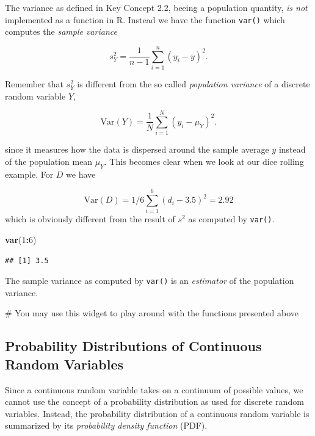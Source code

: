 \documentclass[]{book}
\newenvironment{Shaded}{\begin{snugshade}}{\end{snugshade}}
\newcommand{\KeywordTok}[1]{\textcolor[rgb]{0.13,0.29,0.53}{\textbf{#1}}}
\newcommand{\DecValTok}[1]{\textcolor[rgb]{0.00,0.00,0.81}{#1}}
\newcommand{\OperatorTok}[1]{\textcolor[rgb]{0.81,0.36,0.00}{\textbf{#1}}}
\newcommand{\NormalTok}[1]{#1}
\theoremstyle{definition}
\theoremstyle{definition}
\theoremstyle{definition}
\theoremstyle{remark}
\begin{document}
The variance as defined in Key Concept 2.2, beeing a population
quantity, \emph{is not} implemented as a function in R. Instead we have
the function \texttt{var()} which computes the \emph{sample variance}

\[ s^2_Y = \frac{1}{n-1} \sum_{i=1}^n (y_i - \overline{y})^2. \]

Remember that \(s^2_Y\) is different from the so called \emph{population
variance} of a discrete random variable \(Y\),

\[ \text{Var}(Y) = \frac{1}{N} \sum_{i=1}^N (y_i - \mu_Y)^2. \]

since it measures how the data is dispersed around the sample average
\(\overline{y}\) instead of the population mean \(\mu_Y\). This becomes
clear when we look at our dice rolling example. For \(D\) we have

\[ \text{Var}(D) = 1/6 \sum_{i=1}^6 (d_i - 3.5)^2 = 2.92  \] which is
obviously different from the result of \(s^2\) as computed by
\texttt{var()}.

\begin{Shaded}
\begin{Highlighting}[]
\KeywordTok{var}\NormalTok{(}\DecValTok{1}\OperatorTok{:}\DecValTok{6}\NormalTok{)}
\end{Highlighting}
\end{Shaded}

\begin{verbatim}
## [1] 3.5
\end{verbatim}

The sample variance as computed by \texttt{var()} is an \emph{estimator}
of the population variance.

 \# You may use this widget to play around with the functions presented
above

\subsection*{Probability Distributions of Continuous Random
Variables}\label{probability-distributions-of-continuous-random-variables}

Since a continuous random variable takes on a continuum of possible
values, we cannot use the concept of a probability distribution as used
for discrete random variables. Instead, the probability distribution of
a continuous random variable is summarized by its \emph{probability
density function} (PDF).
\end{document}
